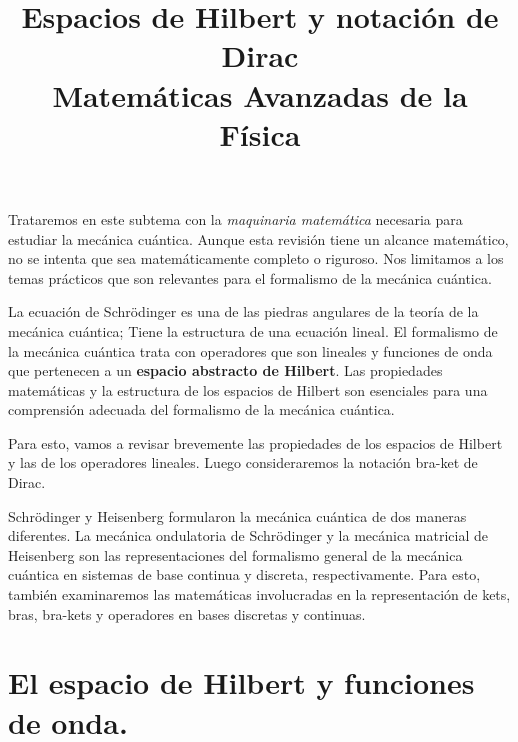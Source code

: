 
\usepackage{standalone}
\usepackage{geometry}
\geometry{top=1.25cm, bottom=1.5cm, left=1.25cm, right=1.25cm}
\title{Espacios de Hilbert y notación de Dirac \\ \large {Matemáticas Avanzadas de la Física}  \vspace{-1.5\baselineskip}}
\date{}
\author{}

\renewcommand\labelenumii{\theenumi.{\arabic{enumii}}}
\maketitle
\fontsize{14}{14}\selectfont
Trataremos en este subtema con la \emph{maquinaria matemática} necesaria para estudiar la mecánica cuántica. Aunque esta revisión tiene un alcance matemático, no se intenta que sea matemáticamente completo o riguroso. Nos limitamos a los temas prácticos que son relevantes para el formalismo de la mecánica cuántica.
\par
La ecuación de Schrödinger es una de las piedras angulares de la teoría de la mecánica cuántica; Tiene la estructura de una ecuación lineal. El formalismo de la mecánica cuántica trata con operadores que son lineales y funciones de onda que pertenecen a un \textbf{espacio abstracto de Hilbert}. Las propiedades matemáticas y la estructura de los espacios de Hilbert son esenciales para una comprensión adecuada del formalismo de la mecánica cuántica.
\par
Para esto, vamos a revisar brevemente las propiedades de los espacios de Hilbert y las de los operadores lineales. Luego consideraremos la notación bra-ket de Dirac.
\par
Schrödinger y Heisenberg formularon la mecánica cuántica de dos maneras diferentes. La mecánica ondulatoria de Schrödinger y la mecánica matricial de Heisenberg son las representaciones del formalismo general de la mecánica cuántica en sistemas de base continua y discreta, respectivamente. Para esto, también examinaremos las matemáticas involucradas en la representación de kets, bras, bra-kets y operadores en bases discretas y continuas.
\section{El espacio de Hilbert y funciones de onda.}
